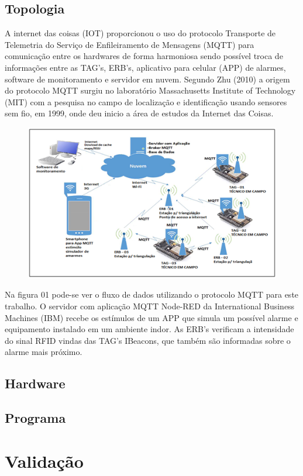 \documentclass[
	article,			%
	12pt,				%
	oneside,			%
	a4paper,			%
	english,			%
	brazil,				%
	sumario=tradicional
	]{abntex2}
\begin{document}
\subsection{Topologia}
A internet das coisas (IOT) proporcionou o uso do protocolo Transporte de Telemetria do Serviço de Enfileiramento de Mensagens (MQTT) para comunicação entre os hardwares de forma harmoniosa sendo possível troca de informações entre as TAG’s, ERB’s, aplicativo para celular (APP) de alarmes, software de monitoramento e servidor em nuvem. 
Segundo Zhu (2010) a origem do protocolo MQTT surgiu no laboratório Massachusetts Institute of Technology (MIT) com a pesquisa no campo de localização e identificação usando sensores sem fio, em 1999, onde deu inicio a área de estudos da Internet das Coisas.
\begin{figure}[t]
\includegraphics{topologia}
\centering
\end{figure}
Na figura 01 pode-se ver o fluxo de dados utilizando o protocolo MQTT para este trabalho.
O servidor com aplicação MQTT Node-RED da International Business Machines (IBM) recebe os estímulos de um APP que simula um possível alarme e equipamento instalado em um ambiente indor. As ERB’s verificam a intensidade do sinal RFID vindas das TAG’s IBeacons, que também são informadas sobre o alarme mais próximo.
\subsection{Hardware}
\subsection{Programa}

\section{Validação}
\end{document}
